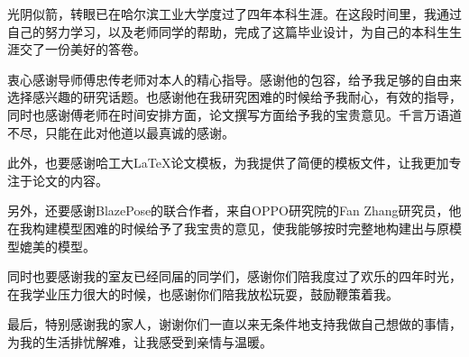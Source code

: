 \begin{acknowledgements}

光阴似箭，转眼已在哈尔滨工业大学度过了四年本科生涯。在这段时间里，我通过自己的努力学习，以及老师同学的帮助，完成了这篇毕业设计，为自己的本科生生涯交了一份美好的答卷。

衷心感谢导师傅忠传老师对本人的精心指导。感谢他的包容，给予我足够的自由来选择感兴趣的研究话题。也感谢他在我研究困难的时候给予我耐心，有效的指导，同时也感谢傅老师在时间安排方面，论文撰写方面给予我的宝贵意见。千言万语道不尽，只能在此对他道以最真诚的感谢。

此外，也要感谢哈工大\LaTeX 论文模板\hithesis，为我提供了简便的模板文件，让我更加专注于论文的内容。

另外，还要感谢BlazePose的联合作者，来自OPPO研究院的Fan Zhang研究员，他在我构建模型困难的时候给予了我宝贵的意见，使我能够按时完整地构建出与原模型媲美的模型。

同时也要感谢我的室友已经同届的同学们，感谢你们陪我度过了欢乐的四年时光，在我学业压力很大的时候，也感谢你们陪我放松玩耍，鼓励鞭策着我。

最后，特别感谢我的家人，谢谢你们一直以来无条件地支持我做自己想做的事情，为我的生活排忧解难，让我感受到亲情与温暖。

\end{acknowledgements}
